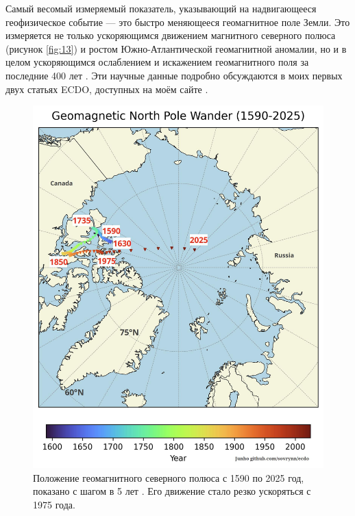 \documentclass[10pt,twocolumn,letterpaper]{article}
\begin{document}
Самый весомый измеряемый показатель, указывающий на надвигающееся геофизическое событие — это быстро меняющееся геомагнитное поле Земли. Это измеряется не только ускоряющимся движением магнитного северного полюса (рисунок \ref{fig:13}) и ростом Южно-Атлантической геомагнитной аномалии, но и в целом ускоряющимся ослаблением и искажением геомагнитного поля за последние 400 лет \cite{3}. Эти научные данные подробно обсуждаются в моих первых двух статьях ECDO, доступных на моём сайте \cite{3}.

\begin{figure}[t]
\begin{center}
   \includegraphics[width=1\linewidth]{npw.jpg}
\end{center}
   \caption{Положение геомагнитного северного полюса с 1590 по 2025 год, показано с шагом в 5 лет \cite{41}. Его движение стало резко ускоряться с 1975 года.}
\label{fig:13}
\label{fig:onecol}
\end{figure}
\end{document}
